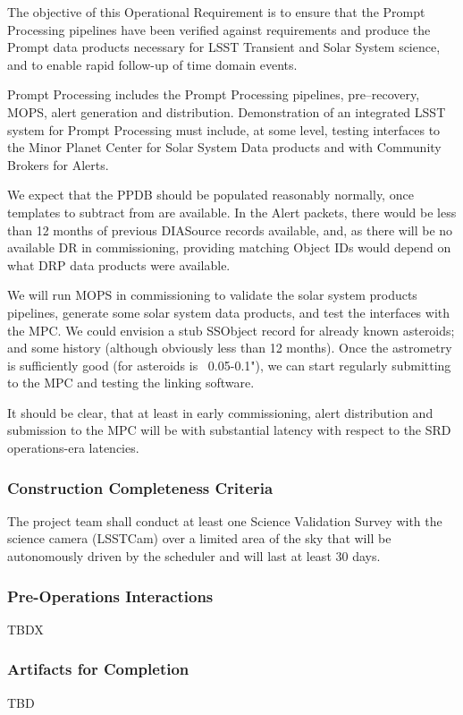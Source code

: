 The objective of this Operational Requirement is to ensure that the Prompt Processing pipelines have been verified against requirements and produce the Prompt data products necessary for LSST Transient and Solar System science, and to enable rapid follow-up of time domain events. 

Prompt Processing includes the Prompt Processing pipelines, pre--recovery, MOPS, alert generation and distribution. Demonstration of an integrated LSST system for Prompt Processing must include, at some level, testing interfaces to the Minor Planet Center for Solar System Data products and with Community Brokers for Alerts. 

We expect that the PPDB should be populated reasonably normally, once templates to subtract from are available.  In the Alert packets, there would be less than 12 months of previous DIASource records available, and, as there will be no available DR in commissioning, providing matching Object IDs would depend on what DRP data products were available. 

We will run MOPS in commissioning to validate the solar system products pipelines, generate some solar system data products, and test the interfaces with the MPC. We could envision a stub SSObject record for already known asteroids; and some history (although obviously less than 12 months). Once the astrometry is sufficiently good (for asteroids is ~0.05-0.1"),  we can start regularly submitting to the MPC and testing the linking software. 

It should be clear, that at least in early commissioning, alert distribution and submission to the MPC  will be with substantial latency with respect to the SRD operations-era latencies.  

\subsubsection{Construction Completeness Criteria}
The project team shall conduct at least one Science Validation Survey with the science camera (LSSTCam) over a limited area of the sky that will be autonomously driven by the scheduler and will last at least 30 days.

\subsubsection{Pre-Operations Interactions}
TBDX

\subsubsection{Artifacts for Completion}
TBD

